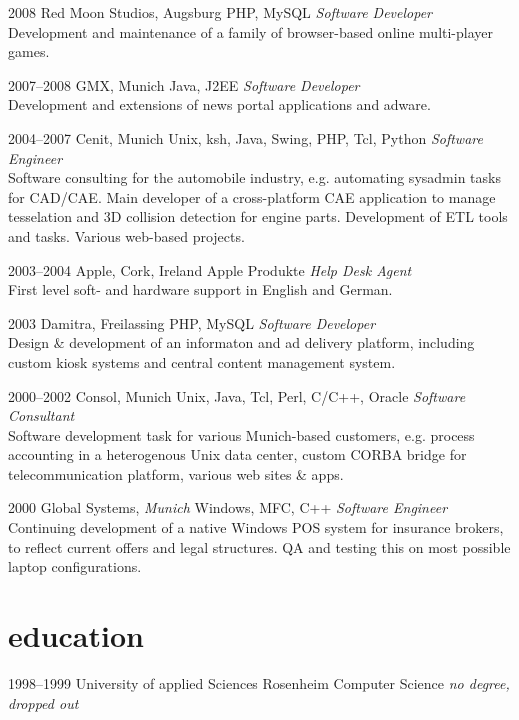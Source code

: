 \documentclass[]{friggeri-cv-a4}
\begin{document}
\begin{entrylist}
\entry
{2008}
{Red Moon Studios, Augsburg}
{PHP, MySQL}
{\emph{Software Developer} \\
Development and maintenance of a family of browser-based online multi-player games.}
\end{entrylist}


\begin{entrylist}
\entry
{2007--2008}
{GMX, Munich}
{Java, J2EE}
{\emph{Software Developer} \\
Development and extensions of news portal applications and adware.}
\end{entrylist}


\begin{entrylist}
\entry
{2004--2007}
{Cenit, Munich}
{Unix, ksh, Java, Swing, PHP, Tcl, Python}
{\emph{Software Engineer} \\
Software consulting for the automobile industry, e.g. automating sysadmin tasks for CAD/CAE. Main developer of a cross-platform CAE application to manage tesselation and 3D collision detection for engine parts. Development of ETL tools and tasks. Various web-based projects.}
\end{entrylist}


\begin{entrylist}
\entry
{2003--2004}
{Apple, Cork, Ireland}
{Apple Produkte}
{\emph{Help Desk Agent} \\
First level soft- and hardware support in English and German.}
\end{entrylist}

\begin{entrylist}
\entry
{2003}
{Damitra, Freilassing}
{PHP, MySQL}
{\emph{Software Developer} \\
Design \& development of an informaton and ad delivery platform, including custom kiosk systems and central content management system.}
\end{entrylist}

\begin{entrylist}
\entry
{2000--2002}
{Consol, Munich}
{Unix, Java, Tcl, Perl, C/C++, Oracle}
{\emph{Software Consultant} \\
Software development task for various Munich-based customers, e.g. process accounting in a heterogenous Unix data center, custom CORBA bridge for telecommunication platform, various web sites \& apps.}
\end{entrylist}

\begin{entrylist}
\entry
{2000}
{Global Systems, \emph{Munich}}
{Windows, MFC, C++}
{\emph{Software Engineer} \\
Continuing development of a native Windows POS system for insurance brokers, to reflect current offers and legal structures. QA and testing this on most possible laptop configurations.}
\end{entrylist}

\section{education}
\begin{entrylist}
\entry
{1998--1999}
{University of applied Sciences Rosenheim}
{Computer Science}
{\textit{no degree, dropped out}}
\end{entrylist}
\end{document}
